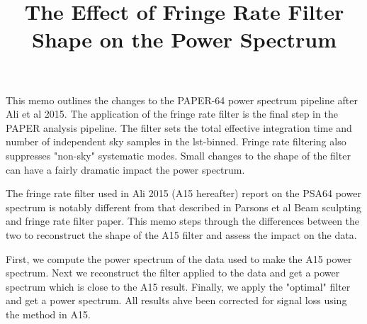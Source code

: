 \documentclass[onecolumn]{emulateapj}
\begin{document}
\title{The Effect of Fringe Rate Filter Shape on the Power Spectrum}





\maketitle
This memo outlines the changes to the PAPER-64 power spectrum pipeline after Ali et al 2015. The application of the fringe rate filter is the final step in the PAPER analysis pipeline. The filter sets the total effective integration time and number of independent sky samples in the lst-binned. Fringe rate filtering also suppresses "non-sky" systematic modes. Small changes to the shape of the filter can have a fairly dramatic impact the power spectrum.

The fringe rate filter used in Ali 2015 (A15 hereafter) report on the PSA64 power spectrum is notably different from that described in Parsons et al Beam sculpting and fringe rate filter paper. This memo steps through the differences between the two to reconstruct the shape of the A15 filter and assess the impact on the data.

First, we compute the power spectrum of the data used to make the A15 power spectrum. Next we reconstruct the filter applied to the data and get a power spectrum which is close to the A15 result. Finally, we apply the "optimal" filter and get a power spectrum. All results ahve been corrected for signal loss using the method in A15.
\end{document}
